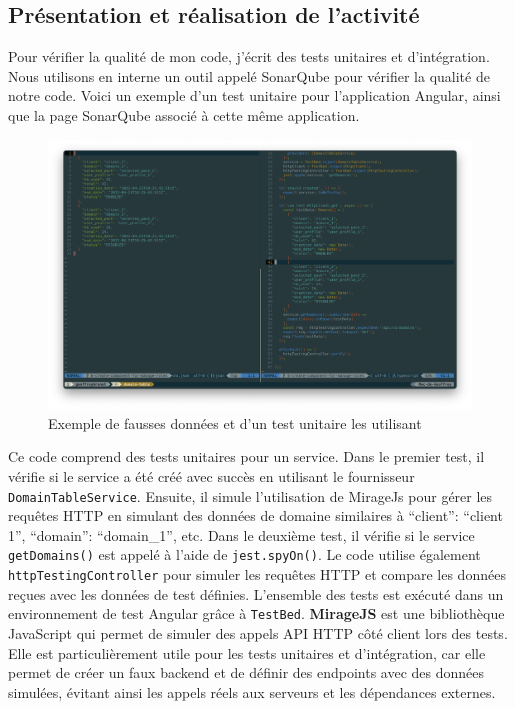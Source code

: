 \documentclass[a4paper, 11pt]{report}
\begin{document}
\subsection{Présentation et réalisation de l'activité}
Pour vérifier la qualité de mon code, j'écrit des tests unitaires et
d'intégration. Nous utilisons en interne un outil appelé SonarQube pour
vérifier la qualité de notre code. Voici un exemple d'un test unitaire
pour l'application Angular, ainsi que la page SonarQube associé à cette
même application.
  \begin{figure}[H]
      \centering
      \includegraphics[scale=0.35,center]{screenshots/felix-test.png}
      \caption{Exemple de fausses données et d'un test unitaire les utilisant}
  \end{figure}
Ce code comprend des tests unitaires pour un service. Dans le premier
test, il vérifie si le service a été créé avec succès en utilisant le
fournisseur \texttt{DomainTableService}. Ensuite, il simule
l'utilisation de MirageJs pour gérer les requêtes HTTP en simulant des
données de domaine similaires à ``client'': ``client 1'', ``domain'':
``domain\_1'', etc. Dans le deuxième test, il vérifie si le service
\texttt{getDomains()} est appelé à l'aide de \texttt{jest.spyOn()}. Le
code utilise également \texttt{httpTestingController} pour simuler les
requêtes HTTP et compare les données reçues avec les données de test
définies. L'ensemble des tests est exécuté dans un environnement de test
Angular grâce à \texttt{TestBed}.
\newline
\newline
\textbf{MirageJS} est une bibliothèque JavaScript qui permet de simuler
des appels API HTTP côté client lors des tests. Elle est
particulièrement utile pour les tests unitaires et d'intégration, car
elle permet de créer un faux backend et de définir des endpoints avec
des données simulées, évitant ainsi les appels réels aux serveurs et les
dépendances externes.
\end{document}
